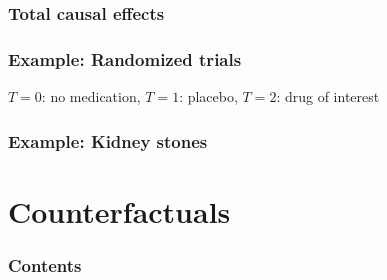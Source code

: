 \documentclass{beamer}
\begin{document}
\begin{frame}
    \frametitle{Total causal effects} 
\end{frame}

\begin{frame}
    \frametitle{Example: Randomized trials} 
    $T = 0$: no medication, $T = 1$: placebo, $T = 2$: drug of interest
\end{frame}

\begin{frame}
    \frametitle{Example: Kidney stones} 
\end{frame}


\section{Counterfactuals}

\begin{frame}
    \frametitle{Contents}
    \tableofcontents[currentsection]
\end{frame}
\end{document}
